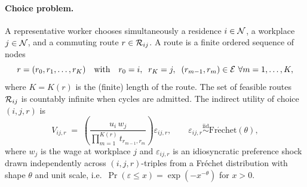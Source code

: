 \paragraph{Choice problem.}
A representative worker chooses simultaneously a residence $i\in\mathcal N$,
a workplace $j\in\mathcal N$, and a commuting route $r\in\mathcal R_{ij}$.  A route is
a finite ordered sequence of nodes
\[
  r=(r_{0},r_{1},\dots,r_{K})
  \quad\text{with}\quad
  r_{0}=i,\;\; r_{K}=j,\;\; (r_{m-1},r_{m})\in\mathcal E\ \forall m=1,\dots,K,
\]
where $K=K(r)$ is the (finite) length of the route.  The set of
feasible routes $\mathcal R_{ij}$ is countably infinite when cycles are
admitted.  The indirect utility of choice $(i,j,r)$ is
\begin{equation}
  V_{ij,r}
  \;=\;
  \left(
    \frac{u_i\,w_j}
         {\prod_{m=1}^{K(r)} t_{r_{m-1},r_{m}}}
  \right)\varepsilon_{ij,r},
  \qquad
  \varepsilon_{ij,r}\stackrel{\mathrm{iid}}{\sim}\mathrm{Fr\acute echet}(\theta),
  \label{eq:utility}
\end{equation}
where $w_j$ is the wage at workplace $j$ and $\varepsilon_{ij,r}$ is
an idiosyncratic preference shock drawn independently across
$(i,j,r)$-triples from a Fr\'echet distribution with shape $\theta$
and unit scale, i.e.\ $\Pr(\varepsilon\le x)=\exp(-x^{-\theta})$
for $x>0$.

